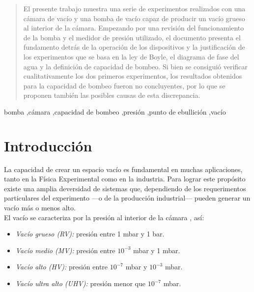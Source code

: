 \documentclass[final,5p,times,twocolumn, nopreprintline]{elsarticle}
\numberwithin{equation}{section}
\begin{document}
\begin{frontmatter}
\begin{abstract}
El presente trabajo muestra una serie de experimentos realizados con una cámara de vacío y una bomba de vacío capaz de producir un vacío grueso al interior de la cámara. Empezando por una revisión del funcionamiento de la bomba y el medidor de presión utilizado, el documento presenta el fundamento detrás de la operación de los dispositivos y la justificación de los experimentos que se basa en la ley de Boyle, el diagrama de fase del agua y la definición de capacidad de bombeo. Si bien se consiguió verificar cualitativamente los dos primeros experimentos, los resultados obtenidos para la capacidad de bombeo fueron no concluyentes, por lo que se proponen también las posibles causas de esta discrepancia.
\end{abstract}

\begin{keyword}

bomba \sep cámara \sep capacidad de bombeo \sep presión \sep punto de ebullición \sep vacío

\end{keyword}

\end{frontmatter}




\section{Introducción}

La capacidad de crear un espacio vacío es fundamental en muchas aplicaciones, tanto en la Física Experimental como en la industria. Para lograr este propósito existe una amplia deversidad de sistemas que, dependiendo de los requerimentos particulares del experimento —o de la producción industrial— pueden generar un vacío más o menos alto.\\

El vacío se caracteriza por la presión al interior de la cámara \cite{jousten2023iso}, así:
\begin{itemize}
\item \emph{Vacío grueso (RV):} presión entre 1 mbar y 1 bar.
\item \emph{Vacío medio (MV):} presión entre $10^{-3}$ mbar y 1 mbar.
\item \emph{Vacío alto (HV):} presión entre $10^{-7}$ mbar y $10^{-3}$ mbar.
\item \emph{Vacío ultra alto (UHV):} presión menor que $10^{-7}$ mbar.
\end{itemize}
\end{document}
